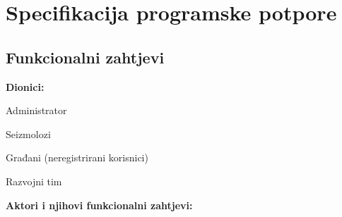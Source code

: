 \chapter{Specifikacija programske potpore}
		
	\section{Funkcionalni zahtjevi}
			
			\noindent \textbf{Dionici:}
			
			\begin{packed_enum}
				
				\item Administrator
				\item Seizmolozi
				\item Građani (neregistrirani korisnici)
				\item Razvojni tim

			\end{packed_enum}
			
			\noindent \textbf{Aktori i njihovi funkcionalni zahtjevi:}
			
